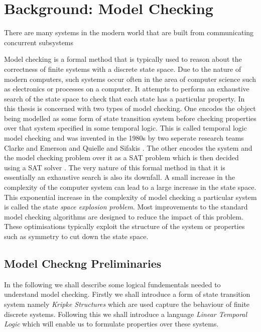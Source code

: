 \chapter{Background: Model Checking}


There are many systems in the modern world that are built from communicating concurrent subsystems 

Model checking is a formal method that is typically used to reason about the correctness of finite systems with a discrete state space. Due to the nature of modern computers, such systems occur often in the area of computer science such as electronics or processes on a computer. It attempts to perform an exhaustive search of the state space to check that each state has a particular property. In this thesis is concerned with two types of model checking. One encodes the object being modelled as some form of state transition system before checking properties over that system specified in some temporal logic. This is called temporal logic model checking and was invented in the 1980s by two seperate research teams  Clarke and Emerson \cite{EM82} and Quielle and Sifakis \cite{JQ82}. The other encodes the system and the model checking problem over it as a SAT problem which is then decided using a SAT solver \cite{MS00}. The very nature of this formal method in that it is essentially an exhaustive search is also its downfall. A small increase in the complexity of the computer system can lead to a large increase in the state space. This exponential increase in the complexity of model checking a particular system is called the state \emph{space explosion problem}. Most improvements to the standard model checking algorithms are designed to reduce the impact of this problem. These optimisations typically exploit the structure of the system or properties such as symmetry to cut down the state space.

\section{Model Checkng Preliminaries}
In the following we shall describe some logical fundementals needed to understand model checking. Firstly we shall introduce a form of state transition system namely \emph{Kripke Structures} which are used capture the behaviour of finite discrete systems. Following this we shall introduce a language \emph{Linear Temporal Logic} which will enable us to formulate properties over these systems.

